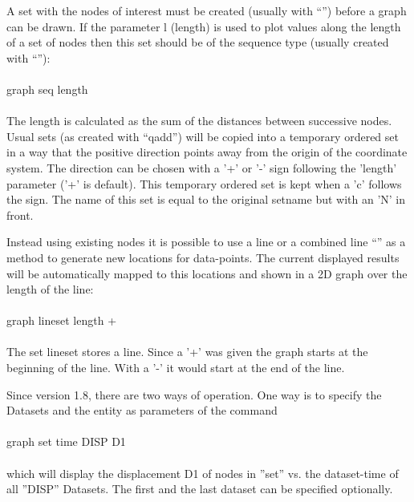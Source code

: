 \documentclass{article}
\begin{document}
A set with the nodes of interest must be created (usually with ``'') before a graph can be drawn. If the parameter l (length) is used to plot values along the length of a set of nodes then this set should be of the sequence type (usually created with ``''):\\\\graph seq length\\\\The length is calculated as the sum of the distances between successive nodes. Usual sets (as created with ``qadd'') will be copied into a temporary ordered set in a way that the positive direction points away from the origin of the coordinate system. The direction can be chosen with a '+' or '-' sign following the 'length' parameter ('+' is default). This temporary ordered set is kept when a 'c' follows the sign. The name of this set is equal to the original setname but with an 'N' in front.

Instead using existing nodes it is possible to use a line or a combined line ``'' as a method to generate new locations for data-points. The current displayed results will be automatically mapped to this locations and shown in a 2D graph over the length of the line:\\\\graph lineset length +\\\\The set lineset stores a line. Since a '+' was given the graph starts at the beginning of the line. With a '-' it would start at the end of the line. 

Since version 1.8, there are two ways of operation. One way is to specify the Datasets and the entity as parameters of the command\\\\graph set time DISP D1\\\\which will display the displacement D1 of nodes in ''set'' vs. the dataset-time of all ''DISP'' Datasets. The first and the last dataset can be specified optionally.
\end{document}
